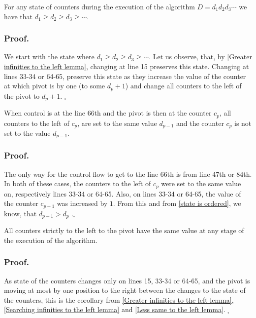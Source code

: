 \begin{lemma}\label{state is ordered}
For any state of counters during the execution of the algorithm $D = d_1d_2d_3\cdots$ we have that 
$d_1 \geq d_2\geq d_3 \geq \cdots$.
\end{lemma}
\subsubsection{Proof.}
We start with the state where $d_1 \geq d_2\geq d_3 \geq \cdots$. Let us observe, that, by 
\ref{Greater infinities to the left lemma}, changing at line 15 preserves this state. 
Changing at lines 33-34 or 64-65, preserve this state as they increase
the value of the counter at which pivot is by one (to some $d_p+1$) and change all counters 
to the left of the pivot to $d_p+1$. $_\square$

\begin{lemma}\label{Less same to the left lemma}
When control is at the line 66th and the pivot is then at the counter $c_p$, all counters 
to the left of $c_p$, are set to the same value $d_{p-1}$ and the counter $c_p$ 
is not set to the value $d_{p-1}$. 
\end{lemma}
\subsubsection{Proof.}
The only way for the control flow to get to the line 66th is from line 47th or 84th. 
In both of these cases, the counters to the left of $c_p$ were set to the same value on, 
respectively lines 33-34 or 64-65. Also, on lines 33-34 or 64-65, the value 
of the counter $c_{p-1}$ was increased by $1$. From this and 
from \ref{state is ordered}, we know, that $d_{p-1} > d_p$ 
.$_\square$

\begin{lemma}\label{same value on the counters to the left}
All counters strictly to the left to the pivot have the same value 
 at any stage of 
the execution of the algorithm.
\end{lemma}
\subsubsection{Proof.}
As state of the counters changes only on lines 15, 33-34 or 64-65, and 
the pivot is moving at most by one position to the right 
between the changes to the state of the counters, this is the 
corollary from \ref{Greater infinities to the left lemma}, 
\ref{Searching infinities to the left lemma} and \ref{Less same to the left lemma}. $_\square$

